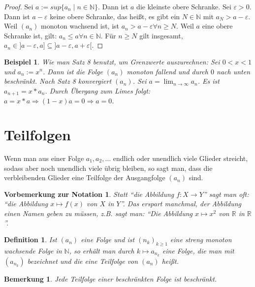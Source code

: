 \documentclass[a4paper,10pt]{article}
\newtheorem*{definition}{Definition}
\newtheorem*{notice}{Bemerkung}
\newtheorem*{example}{Beispiel}
\newtheorem*{vorbemerkung}{Vorbemerkung zur Notation}
\begin{document}
\begin{proof}
 Sei $a := sup\{a_n \mid n \in \mathbb{N}\}$.
 Dann ist $a$ die kleinste obere Schranke.
 Sei $\varepsilon > 0$.
 Dann ist $a - \varepsilon$ keine obere Schranke, das heißt, es gibt ein $N \in \mathbb{N}$ mit $a_N > a - \varepsilon$.
 Weil $(a_n)$ monoton wachsend ist, ist $a_n > a - \varepsilon \forall n \ge N$.
 Weil $a$ eine obere Schranke ist, gilt: $a_n \le a \forall n \in \mathbb{N}$.
 Für $n \ge N$ gilt insgesamt, $a_n \in ]a - \varepsilon, a] \subseteq ]a-\varepsilon, a + \varepsilon[$.
\end{proof}

\begin{example}
 Wie man Satz 8 benutzt, um Grenzwerte auszurechnen:
 Sei $0 < x < 1$ und $a_n := x^n$.
 Dann ist die Folge $(a_n)$ monoton fallend und durch $0$ nach unten beschränkt.
 Nach Satz 8 konvergiert $(a_n)$.
 Sei $a = \lim_{n \rightarrow \infty} a_n$.
 Es ist $a_{n + 1} = x * a_n$.
 Durch Übergang zum Limes folgt: $a = x * a \Rightarrow (1 - x)a = 0 \Rightarrow a = 0$.
\end{example}

\section*{Teilfolgen}

Wenn man aus einer Folge $a_1, a_2, \dots$ endlich oder unendlich viele Glieder streicht, sodass aber noch unendlich viele übrig bleiben, so sagt man, dass die verbleibenden Glieder eine Teilfolge der Ausgangfolge $(a_n)$ sind.

\begin{vorbemerkung}
 Statt ``die Abbildung $f: X \rightarrow Y$'' sagt man oft: ``die Abbildung $x \mapsto f(x)$ von $X$ in $Y$''.
 Das erspart manchmal, der Abbildung einen Namen geben zu müssen, z.B. sagt man: ``Die Abbildung $x \mapsto x^2$ von $\mathbb{R}$ in $\mathbb{R}$''.
\end{vorbemerkung}

\begin{definition}
 Ist $(a_n)$ eine Folge und ist $(n_k)_{k \ge 1}$ eine streng monoton wachsende Folge in $\mathbb{N}$, so erhält man durch $k \mapsto a_{n_k}$ eine Folge, die man mit $(a_{n_k})$ bezeichnet und die eine Teilfolge von $(a_n)$ heißt.
\end{definition}

\begin{notice}
 Jede Teilfolge einer beschränkten Folge ist beschränkt.
\end{notice}
\end{document}
